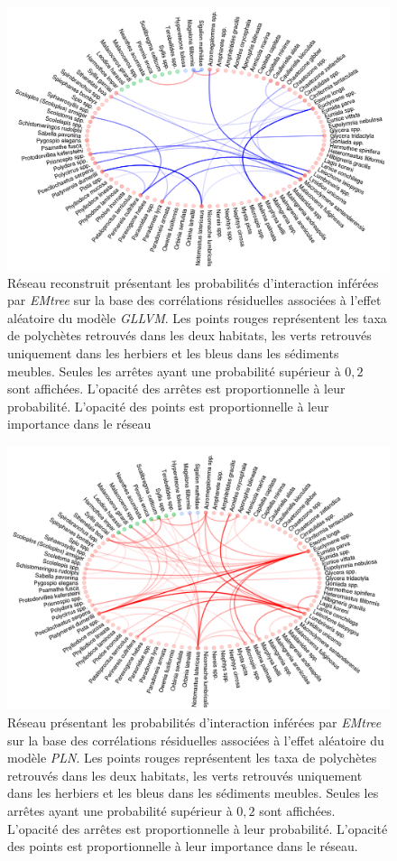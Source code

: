 \documentclass[12pt,]{article}
\makeatletter
\def\maxwidth{\ifdim\Gin@nat@width>\linewidth\linewidth
\else\Gin@nat@width\fi}
\let\Oldincludegraphics\includegraphics
\renewcommand{\includegraphics}[1]{\Oldincludegraphics[width=\maxwidth]{#1}}
\makeatother
\begin{document}
\begin{figure}
\hypertarget{fig:netgllvm}{%
\centering
\includegraphics{figures/gllvm-network-1.png}
\caption{Réseau reconstruit présentant les probabilités d'interaction
inférées par \emph{EMtree} sur la base des corrélations résiduelles
associées à l'effet aléatoire du modèle \emph{GLLVM}. Les points rouges
représentent les taxa de polychètes retrouvés dans les deux habitats,
les verts retrouvés uniquement dans les herbiers et les bleus dans les
sédiments meubles. Seules les arrêtes ayant une probabilité supérieur à
\(0,2\) sont affichées. L'opacité des arrêtes est proportionnelle à leur
probabilité. L'opacité des points est proportionnelle à leur importance
dans le réseau}\label{fig:netgllvm}
}
\end{figure}

\begin{figure}
\hypertarget{fig:netpln}{%
\centering
\includegraphics{figures/pln-network-1.png}
\caption{Réseau présentant les probabilités d'interaction inférées par
\emph{EMtree} sur la base des corrélations résiduelles associées à
l'effet aléatoire du modèle \emph{PLN}. Les points rouges représentent
les taxa de polychètes retrouvés dans les deux habitats, les verts
retrouvés uniquement dans les herbiers et les bleus dans les sédiments
meubles. Seules les arrêtes ayant une probabilité supérieur à \(0,2\)
sont affichées. L'opacité des arrêtes est proportionnelle à leur
probabilité. L'opacité des points est proportionnelle à leur importance
dans le réseau.}\label{fig:netpln}
}
\end{figure}
\end{document}

